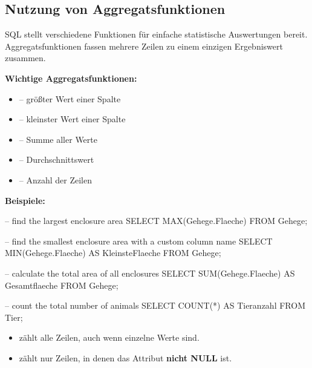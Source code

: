 \subsection{Nutzung von Aggregatsfunktionen}

    SQL stellt verschiedene Funktionen für einfache statistische Auswertungen bereit.  
    Aggregatsfunktionen fassen mehrere Zeilen zu einem einzigen Ergebniswert zusammen.

    \textbf{Wichtige Aggregatsfunktionen:}
    \begin{itemize}
        \item {} – größter Wert einer Spalte
        \item {} – kleinster Wert einer Spalte
        \item {} – Summe aller Werte
        \item {} – Durchschnittswert
        \item {} – Anzahl der Zeilen
    \end{itemize}

    \textbf{Beispiele:}
    \begin{sql}
    -- find the largest enclosure area
    SELECT MAX(Gehege.Flaeche)
    FROM Gehege;

    -- find the smallest enclosure area with a custom column name
    SELECT MIN(Gehege.Flaeche) AS KleinsteFlaeche
    FROM Gehege;

    -- calculate the total area of all enclosures
    SELECT SUM(Gehege.Flaeche) AS Gesamtflaeche
    FROM Gehege;

    -- count the total number of animals
    SELECT COUNT(*) AS Tieranzahl
    FROM Tier;
    \end{sql}

    \begin{tcolorbox}[blue={Hinweis zu \rCode{COUNT}}]
        \begin{itemize}
            \item {} zählt alle Zeilen, auch wenn einzelne Werte  sind.
            \item {} zählt nur Zeilen, in denen das Attribut \textbf{nicht NULL} ist.
        \end{itemize}
    \end{tcolorbox}

